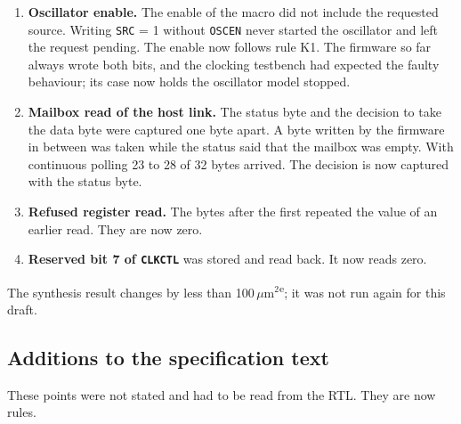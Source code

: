 \documentclass[10pt,a4paper]{article}
\newcommand{\est}{\textsuperscript{e}}
\newcommand{\reg}[1]{\texttt{#1}}
\begin{document}
\begin{enumerate}
\item \textbf{Oscillator enable.} The enable of the macro did not include the requested source. Writing \reg{SRC} = 1
without \reg{OSCEN} never started the oscillator and left the request pending. The enable now follows rule K1.
The firmware so far always wrote both bits, and the clocking testbench had expected the faulty behaviour; its case
now holds the oscillator model stopped.
\item \textbf{Mailbox read of the host link.} The status byte and the decision to take the data byte were captured
one byte apart. A byte written by the firmware in between was taken while the status said that the mailbox was
empty. With continuous polling 23 to 28 of 32 bytes arrived. The decision is now captured with the status byte.
\item \textbf{Refused register read.} The bytes after the first repeated the value of an earlier read. They are
now zero.
\item \textbf{Reserved bit 7 of \reg{CLKCTL}} was stored and read back. It now reads zero.
\end{enumerate}

The synthesis result changes by less than 100\,$\mu$m$^2$\est; it was not run again for this draft.

\subsection{Additions to the specification text}

These points were not stated and had to be read from the RTL. They are now rules.
\end{document}
